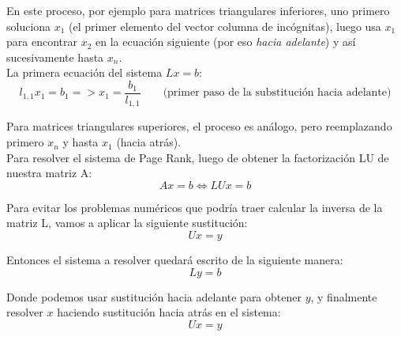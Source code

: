 			En este proceso, por ejemplo para matrices triangulares inferiores, uno primero soluciona $x_1$ (el primer elemento del vector columna de incógnitas), luego usa $x_1$ para encontrar $x_2$ en la ecuación siguiente (por eso \textit{hacia adelante}) y así sucesivamente hasta $x_n$. \\

			La primera ecuación del sistema $Lx = b$: \\

			\begin{equation}
				l_{1,1} x_{1} = b_{1} => x_{1} = \frac{b_{1}}{l_{1,1}} \qquad \text{(primer paso de la substitución hacia adelante)}
			\end{equation}

			Para matrices triangulares superiores, el proceso es análogo, pero reemplazando primero $x_n$ y hasta $x_1$ (hacia atrás). \\

			Para resolver el sistema de Page Rank, luego de obtener la factorización LU de nuestra matriz A: \\

			\begin{equation}
				Ax = b \Leftrightarrow LUx = b
			\end{equation}

			Para evitar los problemas numéricos que podría traer calcular la inversa de la matriz L, vamos a aplicar la siguiente sustitución: \\

			\begin{equation}
				Ux = y
			\end{equation}

			Entonces el sistema a resolver quedará escrito de la siguiente manera: \\

			\begin{equation}
				Ly = b
			\end{equation}

			Donde podemos usar sustitución hacia adelante para obtener $y$, y finalmente resolver $x$ haciendo sustitución hacia atrás en el sistema: \\

			\begin{equation}
				Ux = y
			\end{equation}

			\quad \\

